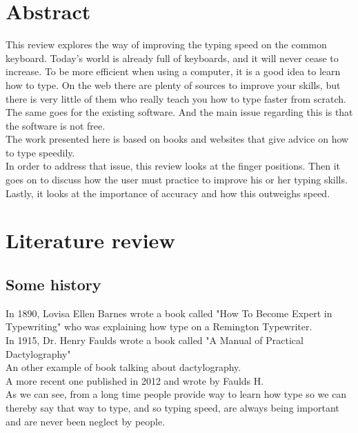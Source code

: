 \thispagestyle{empty}
\clearpage

\setcounter{page}{1}
\chapter{Abstract}
This review explores the way of improving the typing speed on the common keyboard.
Today's world is already full of keyboards, and it will never cease to increase. To be more efficient when using a computer, it is a good idea to learn how to type. On the web there are plenty of sources to improve your skills, but there is very little of them who really teach you how to type faster from scratch. The same goes for the existing software. And the main issue regarding this is that the software is not free.\\
The work presented here is based on books and websites that give advice on how to type speedily.\\
In order to address that issue, this review looks at the finger positions. Then it goes on to discuss how the user must practice to improve his or her typing skills. Lastly, it looks at the importance of accuracy and how this outweighs speed.

\clearpage
\chapter{Literature review}
\section{Some history}
In 1890, Lovisa Ellen Barnes wrote a book called "How To Become Expert in Typewriting"\cite{ref2} who was explaining how type on a Remington Typewriter.\\
In 1915, Dr. Henry Faulds wrote a book called "A Manual of Practical Dactylography"\cite{ref3}\\
An other example of book talking about dactylography.\cite{ref5}\\   
A more recent one published in 2012 and wrote by Faulds H.\cite{ref4}\\
As we can see, from a long time people provide way to learn how type so we can thereby say that way to type, and so typing speed, are always being important and are never been neglect by people.\\

